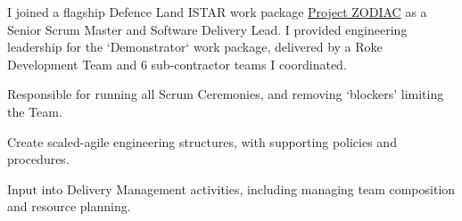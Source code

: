 I joined a flagship Defence Land ISTAR work package \href{https://www.roke.co.uk/news/digitising-land-tactical-istar}{Project ZODIAC} as a Senior Scrum Master and Software Delivery Lead. I provided engineering leadership for the `Demonstrator` work package, delivered by a Roke Development Team and 6 sub-contractor teams I coordinated.
\vspace{0.25em}
\begin{tightemize}
  \item Responsible for running all Scrum Ceremonies, and removing `blockers' limiting the Team.
  \item Create scaled-agile engineering structures, with supporting policies and procedures.
  \item Input into Delivery Management activities, including managing team composition and resource planning.
\end{tightemize}
\sectionsep{}
